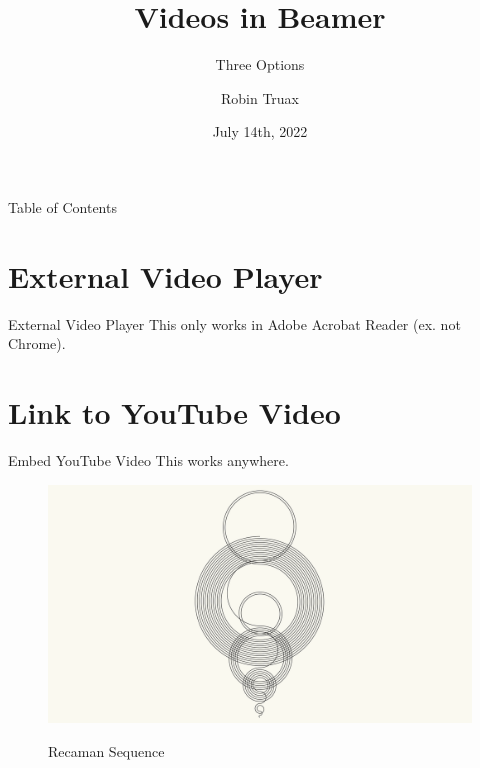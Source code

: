 \documentclass[compress]{beamer}
\title{Videos in Beamer}
\subtitle{Three Options \subtitleline}
\author{Robin Truax}
\institute{Stanford University}
\date{July 14th, 2022}
\begin{document}
\begin{frame}[plain]
\titlepage
\end{frame}

\begin{frame}{Table of Contents}
    \tableofcontents
\end{frame}

\section{External Video Player}
\begin{frame}{External Video Player}
    This only works in Adobe Acrobat Reader (ex. not Chrome).
    \centering
\end{frame}

\section{Link to YouTube Video}
\begin{frame}{Embed YouTube Video}
    This works anywhere.
    \begin{figure}
        \centering
        \href{https://www.youtube.com/watch?v=NCSb1YVd0ZY}{\includegraphics[width=\textwidth]{Recaman.png}}
        \caption{Recaman Sequence}
        \label{fig:recaman-sequence}
    \end{figure}
\end{frame}
\end{document}
